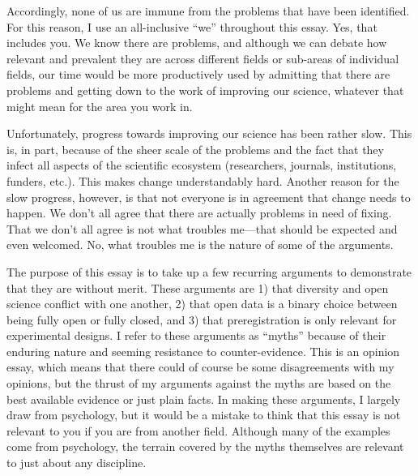 \documentclass[authordate, empirical,issue]{jote-new-article}
\begin{document}
Accordingly, none of us are immune from the problems that have been identified. For this reason, I use an all-inclusive “we” throughout this essay. Yes, that includes you. We know there are problems, and although we can debate how relevant and prevalent they are across different fields or sub-areas of individual fields, our time would be more productively used by admitting that there are problems and getting down to the work of improving our science, whatever that might mean for the area you work in.







Unfortunately, progress towards improving our science has been rather slow. This is, in part, because of the sheer scale of the problems and the fact that they infect all aspects of the scientific ecosystem (researchers, journals, institutions, funders, etc.). This makes change understandably hard. Another reason for the slow progress, however, is that not everyone is in agreement that change needs to happen. We don't all agree that there are actually problems in need of fixing. That we don't all agree is not what troubles me—that should be expected and even welcomed. No, what troubles me is the nature of some of the arguments.







The purpose of this essay is to take up a few recurring arguments to demonstrate that they are without merit. These arguments are 1) that diversity and open science conflict with one another, 2) that open data is a binary choice between being fully open or fully closed, and 3) that preregistration is only relevant for experimental designs. I refer to these arguments as “myths” because of their enduring nature and seeming resistance to counter-evidence. This is an opinion essay, which means that there could of course be some disagreements with my opinions, but the thrust of my arguments against the myths are based on the best available evidence or just plain facts. In making these arguments, I largely draw from psychology, but it would be a mistake to think that this essay is not relevant to you if you are from another field. Although many of the examples come from psychology, the terrain covered by the myths themselves are relevant to just about any discipline.
\end{document}
